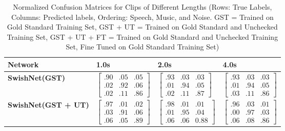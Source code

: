 



\begin{table}
	\centering
	\caption{Normalized Confusion Matrices for Clips of Different Lengths (Rows: True Labels, Columns: Predicted labels, Ordering: Speech, Music, and Noise. GST = Trained on Gold Standard Training Set, GST + UT = Trained on Gold Standard and Unchecked Training Set, GST + UT + FT = Trained on Gold Standard and Unchecked Training Set, Fine Tuned on Gold Standard Training Set)}
	\begin{tabular}{M{13em}P{6.5em}P{6.5em}P{6.5em}} 
		
		\toprule
		\textbf{Network} & \textbf{1.0s} & \textbf{2.0s} & \textbf{4.0s} \\
		
		
		\midrule
		\textbf{SwishNet(GST)} 
		& $\begin{bmatrix}
		.90 & .05 & .05\\
		.02 & .92 & .06\\
		.02 & .11 & .86
		\end{bmatrix} $
		& $\begin{bmatrix}
		.93 & .03 & .03\\
		.01 & .94 & .05\\
		.02 & .11 & .87
		\end{bmatrix}$
		& $\begin{bmatrix}
		.93 & .03 & .03\\
		.01 & .94 & .05\\
		.03 & .11 & .86
		\end{bmatrix}$ \\
		
		\midrule
		\textbf{SwishNet(GST + UT)}
		& $\begin{bmatrix}
		.97 & .01 & .02\\
		.03 & .91 & .06\\
		.06 & .05 & .89
		\end{bmatrix}$ 
		& $\begin{bmatrix}
		.98 & .01 & .01\\
		.01 & .95 & .04\\
		.06 & .06 & 0.88
		\end{bmatrix}$
		& $\begin{bmatrix}
		.96 & .03 & .01\\
		.00 & .97 & .03\\
		.06 & .08 & .86
		\end{bmatrix}$\\
		

\end{tabular}
\end{table}
